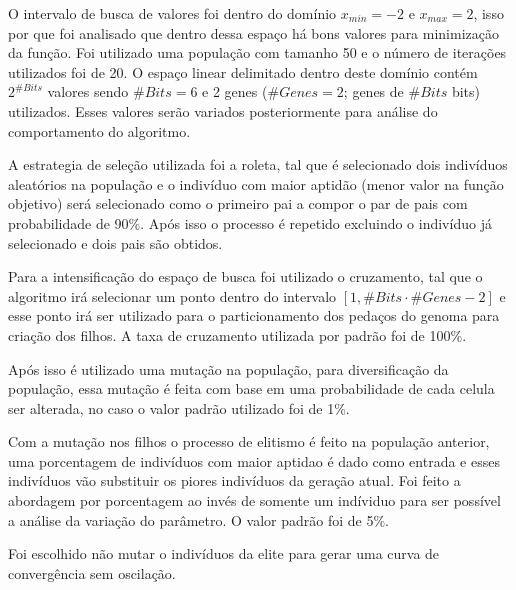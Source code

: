 \documentclass[11pt]{article}
\begin{document}
O intervalo de busca de valores foi dentro do domínio \(x_{min} = -2\) e \(x_{max} = 2\), isso por que foi analisado que dentro dessa espaço há bons valores para minimização da função. Foi utilizado uma população com tamanho 50 e o número de iterações utilizados foi de 20. O espaço linear delimitado dentro deste domínio contém \(2^{\# Bits}\) valores sendo \(\# Bits=6\) e 2 genes (\(\# Genes = 2\); genes de \(\# Bits\) bits) utilizados. Esses valores serão variados posteriormente para análise do comportamento do algoritmo.

A estrategia de seleção utilizada foi a roleta, tal que é selecionado dois indivíduos aleatórios na população e o indivíduo com maior aptidão (menor valor na função objetivo) será selecionado como o primeiro pai a compor o par de pais com probabilidade de 90\%. Após isso o processo é repetido excluindo o indivíduo já selecionado e dois pais são obtidos.

Para a intensificação do espaço de busca foi utilizado o cruzamento, tal que o algoritmo irá selecionar um ponto dentro do intervalo \([1,\# Bits \cdot \# Genes -2]\) e esse ponto irá ser utilizado para o particionamento dos pedaços do genoma para criação dos filhos. A taxa de cruzamento utilizada por padrão foi de 100\%.

Após isso é utilizado uma mutação na população, para diversificação da população, essa mutação é feita com base em uma probabilidade de cada celula ser alterada, no caso o valor padrão utilizado foi de 1\%.

Com a mutação nos filhos o processo de elitismo é feito na população anterior, uma porcentagem de indivíduos com maior aptidao é dado como entrada e esses indivíduos vão substituir os piores indivíduos da geração atual. Foi feito a abordagem por porcentagem ao invés de somente um indíviduo para ser possível a análise da variação do parâmetro. O valor padrão foi de 5\%.

Foi escolhido não mutar o indivíduos da elite para gerar uma curva de convergência sem oscilação.
\end{document}
